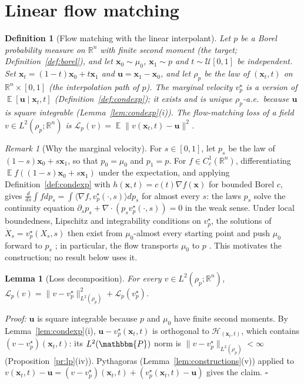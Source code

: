 \documentclass{article}
\DeclareMathOperator{\E}{\mathbb{E}}
\newcommand{\RR}{\mathbb{R}}
\newcommand{\PP}{\mathbbm{P}}
\newcommand{\cL}{\mathcal{L}}
\newcommand{\bx}{\mathbf{x}}
\newcommand{\bu}{\mathbf{u}}
\newcommand{\vstar}{v^{\star}}
\theoremstyle{plain}
\newtheorem{lemma}[theorem]{Lemma}
\newtheorem{definition}[theorem]{Definition}
\theoremstyle{remark}
\newtheorem{remark}[theorem]{Remark}
\begin{document}
\section{Linear flow matching}\label{sec:prelim}

\begin{definition}[Flow matching with the linear interpolant]\label{def:fm}
Let $p$ be a Borel probability measure on $\RR^n$ with finite second moment (the \emph{target}; Definition~\ref{def:borel}),
and let $\bx_0\sim\mu_0$, $\bx_1\sim p$ and $t\sim\mathcal U[0,1]$ be independent. Set
$\bx_t=(1-t)\bx_0+t\bx_1$ and $\bu=\bx_1-\bx_0$, and let $\rho_p$ be the law of $(\bx_t,t)$ on
$\RR^n\times[0,1]$ (the \emph{interpolation path} of $p$). The \emph{marginal velocity} $\vstar_p$ is a
version of $\E[\bu\mid\bx_t,t]$ (Definition~\ref{def:condexp}); it exists and is unique $\rho_p$-a.e.\ because $\bu$ is square
integrable (Lemma~\ref{lem:condexp}(i)). The \emph{flow-matching loss} of a field $v\in L^2(\rho_p;\RR^n)$ is
$\cL_p(v)=\E\|v(\bx_t,t)-\bu\|^2$.
\end{definition}

\begin{remark}[Why the marginal velocity]\label{rem:continuity}
For $s\in[0,1]$, let $p_s$ be the law of $(1-s)\bx_0+s\bx_1$, so that $p_0=\mu_0$ and $p_1=p$. For $f\in C^1_c(\RR^n)$, differentiating
$\E f((1-s)\bx_0+s\bx_1)$ under the expectation, and applying Definition~\ref{def:condexp} with $h(\bx,t)=c(t)\nabla f(\bx)$ for bounded Borel $c$,
gives $\frac{d}{ds}\int fdp_s=\int\langle\nabla f,\vstar_p(\cdot,s)\rangle dp_s$ for almost every $s$: the laws $p_s$ solve the continuity equation
$\partial_sp_s+\nabla\cdot(p_s\vstar_p(\cdot,s))=0$ in the weak sense. Under local boundedness, Lipschitz and integrability conditions on
$\vstar_p$, the solutions of $\dot X_s=\vstar_p(X_s,s)$ then exist from $\mu_0$-almost every starting point and push $\mu_0$ forward to $p_s$
\citep[Prop.~8.1.8]{ambrosio2008gradient}; in particular, the flow transports $\mu_0$ to $p$
\citep{lipman2023flow,liu2023flow,albergo2023building}. This motivates the construction; no result below uses it.
\end{remark}

\begin{lemma}[Loss decomposition]\label{lem:fm_loss}
For every $v\in L^2(\rho_p;\RR^n)$, $\cL_p(v)=\|v-\vstar_p\|^2_{L^2(\rho_p)}+\cL_p(\vstar_p)$.
\end{lemma}
\textit{Proof:} $\bu$ is square integrable because $p$ and $\mu_0$ have finite second moments. By Lemma~\ref{lem:condexp}(i),
$\bu-\vstar_p(\bx_t,t)$ is orthogonal to $\mathcal H_{(\bx_t,t)}$, which contains $(v-\vstar_p)(\bx_t,t)$: its $L^2(\PP)$ norm is
$\|v-\vstar_p\|_{L^2(\rho_p)}<\infty$ (Proposition~\ref{pr:lp}(iv)). Pythagoras (Lemma~\ref{lem:constructions}(v)) applied to
$v(\bx_t,t)-\bu=(v-\vstar_p)(\bx_t,t)+(\vstar_p(\bx_t,t)-\bu)$ gives the claim. \hfill$\square$
\end{document}
